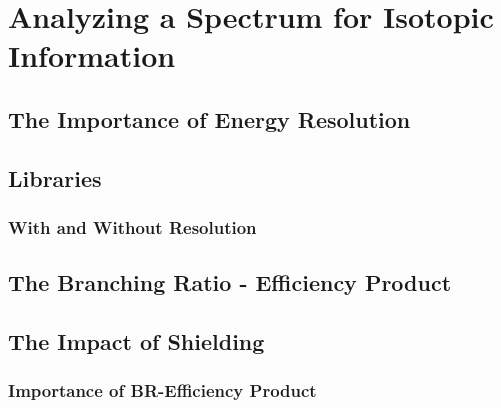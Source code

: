 \chapter{Analyzing a Spectrum for Isotopic Information}

\section{The Importance of Energy Resolution}

\section{Libraries}
\subsection{With and Without Resolution}

\section{The Branching Ratio - Efficiency Product}

\section{The Impact of Shielding}
\subsection{Importance of BR-Efficiency Product}

